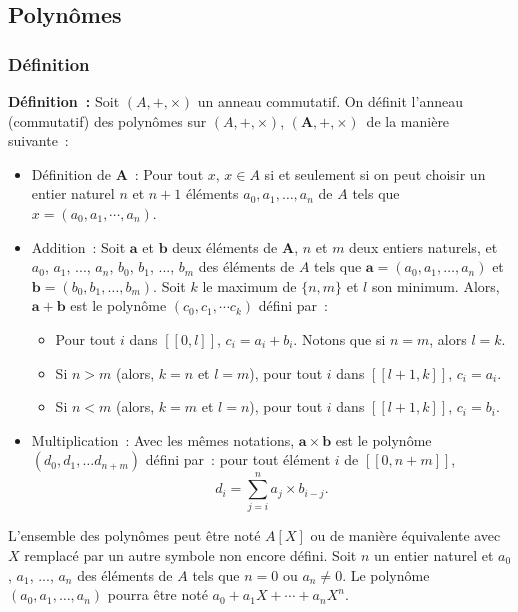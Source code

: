 \subsection{Polynômes}

\subsubsection{Définition} 

\noindent\textbf{Définition :} Soit $(A, +, \times)$ un anneau commutatif. 
    On définit l'anneau (commutatif) des polynômes sur $(A, +, \times)$, $(\mathbf{A}, +, \times)$ de la manière suivante : 
    \begin{itemize}[nosep]
        \item Définition de $\mathbf{A}$ : Pour tout $x$, $x \in A$ si et seulement si on peut choisir un entier naturel $n$ et $n+1$ éléments $a_0, a_1, \dots, a_n$ de $A$ tels que $x = (a_0, a_1, \cdots, a_n)$.
        \item Addition : Soit $\mathbf{a}$ et $\mathbf{b}$ deux éléments de $\mathbf{A}$, $n$ et $m$ deux entiers naturels, et $a_0$, $a_1$, ..., $a_n$, $b_0$, $b_1$, ..., $b_m$ des éléments de $A$ tels que $\mathbf{a} = (a_0, a_1, \dots, a_n)$ et $\mathbf{b} = (b_0, b_1, \dots, b_m)$.
            Soit $k$ le maximum de $\lbrace n, m \rbrace$ et $l$ son minimum.
            Alors, $\mathbf{a} + \mathbf{b}$ est le polynôme $(c_0, c_1, \cdots c_k)$ défini par : 
            \begin{itemize}[nosep]
                \item Pour tout $i$ dans $[\![0, l]\!]$, $c_i = a_i + b_i$.
                    Notons que si $n = m$, alors $l = k$.
                \item Si $n > m$ (alors, $k = n$ et $l = m$), pour tout $i$ dans $[\![l+1, k]\!]$, $c_i = a_i$.
                \item Si $n < m$ (alors, $k = m$ et $l = n$), pour tout $i$ dans $[\![l+1, k]\!]$, $c_i = b_i$.
            \end{itemize}
        \item Multiplication : Avec les mêmes notations, $\mathbf{a} \times \mathbf{b}$ est le polynôme $(d_0, d_1, \dots d_{n+m})$ défini par : pour tout élément $i$ de $[\![0, n+m]\!]$, 
            \begin{equation*}
                d_i = \sum_{j=i}^n a_j \times b_{i-j}.
            \end{equation*}
    \end{itemize}
    L'ensemble des polynômes peut être noté $A[X]$ ou de manière équivalente avec $X$ remplacé par un autre symbole non encore défini. 
    Soit $n$ un entier naturel et $a_0$, $a_1$, ..., $a_n$ des éléments de $A$ tels que $n = 0$ ou $a_n \neq 0$.
    Le polynôme $(a_0, a_1, \dots, a_n)$ pourra être noté $a_0 + a_1 X + \cdots + a_n X^n$.

